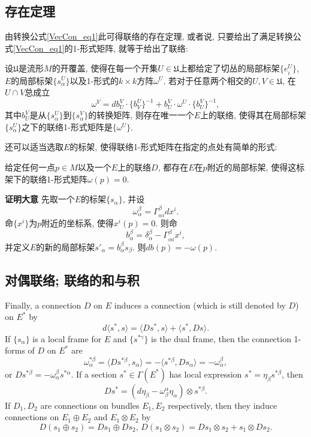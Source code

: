 \subsection{存在定理}
由转换公式\autoref{VecCon_eq1}此可得联络的存在定理, 或者说, 只要给出了满足转换公式\autoref{VecCon_eq1}的1-形式矩阵, 就等于给出了联络:
\begin{theorem}{}
设$\mathfrak{U}$是流形$M$的开覆盖, 使得在每一个开集$U\in\mathfrak{U}$上都给定了切丛的局部标架$\{e^U_i\}$, $E$的局部标架$\{s^U_\alpha\}$以及1-形式的$k\times k$方阵$\omega^U$. 若对于任意两个相交的$U,V\in\mathfrak{U}$, 在$U\cap V$总成立
$$
\omega^V=db^V_U\cdot \{b_V^U\}^{-1}+b^V_U\cdot\omega^U\cdot \{b^V_U\}^{-1},
$$
其中$b^V_U$是从$\{s^U_\alpha\}$到$\{s^V_\alpha\}$的转换矩阵, 则存在唯一一个$E$上的联络, 使得其在局部标架$\{s^U_\alpha\}$之下的联络1-形式矩阵是$\{\omega^U\}$.
\end{theorem}

还可以适当选取$E$的标架, 使得联络1-形式矩阵在指定的点处有简单的形式:
\begin{theorem}{}
给定任何一点$p\in M$以及一个$E$上的联络$D$, 都存在$E$在$p$附近的局部标架, 使得这标架下的联络1-形式矩阵$\omega(p)=0$.
\end{theorem}
\textbf{证明大意} 先取一个$E$的标架$\{s_\alpha\}$, 并设
$$
\omega^\beta_\alpha=\Gamma_{\alpha i}^\beta dx^i.
$$
命$\{x^i\}$为$p$附近的坐标系, 使得$x^i(p)=0$. 则命
$$
b_\alpha^\beta=\delta_\alpha^\beta-\Gamma_{\alpha i}^\beta x^i,
$$
并定义$E$的新的局部标架$s'_\alpha=b_\alpha^\beta s_\beta$. 则$db(p)=-\omega(p)$.

\subsection{对偶联络; 联络的和与积}
Finally, a connection $D$ on $E$ induces a connection (which is still denoted by $D$) on $E^*$ by
$$d\langle s^*,s\rangle=\langle Ds^*,s\rangle+\langle s^*,Ds\rangle.$$
If $\{s_\alpha\}$ is a local frame for $E$ and $\{s^{*\gamma}\}$ is the dual frame, then the connection 1-forms of $D$ on $E^*$ are
$$\omega^{*\beta}_\alpha=\langle Ds^{*\beta},s_\alpha\rangle=-\langle s^{*\beta},Ds_\alpha\rangle=-\omega^\beta_\alpha,$$
or $Ds^{*\beta}=-\omega^\beta_\alpha s^{*\alpha}$. If a section $s^*\in\Gamma(E^*)$ has local expression $s^*=\eta_\beta s^{*\beta}$, then
$$Ds^*=(d\eta_\beta-\omega_\beta^\alpha\eta_\alpha)\otimes s^{*\beta}.$$
If $D_1,D_2$ are connections on bundles $E_1,E_2$ respectively, then they induce connections on $E_1\oplus E_2$ and $E_1\otimes E_2$ by
$$D(s_1\oplus s_2)=Ds_1\oplus Ds_2,\,D(s_1\otimes s_2)=Ds_1\otimes s_2+s_1\otimes Ds_2.$$